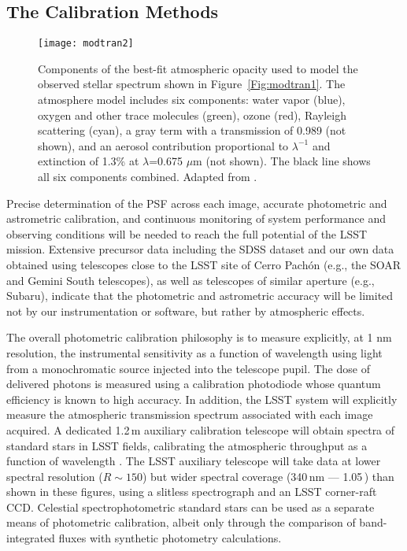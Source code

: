 \subsection{The Calibration Methods}



\begin{figure}
\texttt{[image: modtran2]}
\caption{Components of the best-fit atmospheric opacity used to
model the observed stellar spectrum shown in Figure~\ref{Fig:modtran1}.
The atmosphere model \citep[MODTRAN;][]{1999SPIE.3866....2A} includes six
components: water vapor (blue), oxygen and other trace molecules
(green), ozone (red), Rayleigh scattering (cyan), a gray term
with a transmission of 0.989 (not shown), and an aerosol contribution
proportional to $\lambda^{-1}$ and extinction of 1.3\% at $\lambda$=0.675 $\mu$m
(not shown). The black line shows all six components combined.
Adapted from \citet{2010ApJ...720..811B}.}
\label{Fig:modtran2}
\end{figure}


Precise determination of the PSF across each image,
accurate photometric and astrometric calibration, and continuous monitoring
of system performance and observing conditions will be needed to reach the
full potential of the LSST mission. Extensive precursor data including the
SDSS dataset and our own data obtained using telescopes close to
the LSST site of Cerro Pach\'{o}n (e.g., the SOAR and Gemini South telescopes),
as well as telescopes of similar aperture (e.g., Subaru), indicate that the
photometric and astrometric accuracy will be limited not by our instrumentation
or software, but rather by atmospheric effects.

The overall photometric calibration philosophy \citep{2006ApJ...646.1436S} is to measure explicitly, at 1 nm resolution, the
instrumental sensitivity as a function of wavelength using light from a monochromatic source injected
into the telescope pupil. The dose of delivered photons is measured using a calibration photodiode whose quantum
efficiency is known to high accuracy. In addition, the LSST system will explicitly measure the atmospheric transmission
spectrum associated with each image acquired. A
dedicated 1.2\,m auxiliary calibration telescope will obtain spectra of
standard stars in LSST fields, calibrating the atmospheric throughput
as a function of wavelength  \citep[][see Figures \ref{Fig:modtran1} and \ref{Fig:modtran2}]{2007PASP..119.1163S}.
The LSST auxiliary telescope will take
data at lower spectral resolution ($R \sim 150$) but wider spectral
coverage (340\,nm --- 1.05\,\micron) than shown in these figures, using a
slitless spectrograph and an LSST corner-raft CCD.
Celestial spectrophotometric standard stars can be used as a separate means of photometric calibration, albeit only through the
comparison of band-integrated fluxes with synthetic photometry calculations.


